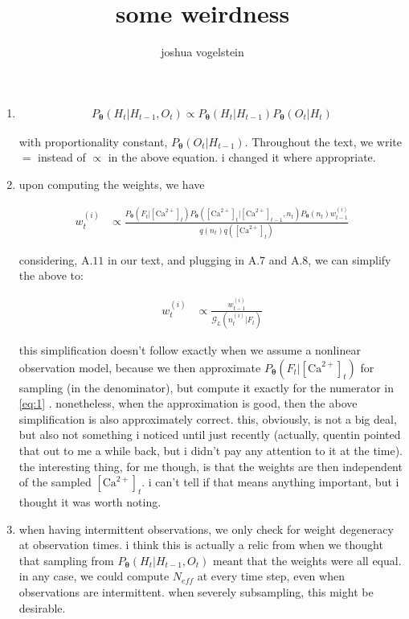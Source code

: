 \documentclass{article}
\title{some weirdness}
\author{joshua vogelstein}
\providecommand{\ve}[1]{\boldsymbol{#1}}
\providecommand{\ve}[1]{\boldsymbol{#1}}
\newcommand{\thetn}{\ve{\theta}}
\newcommand{\p}{P_{\thetn}}
\newcommand{\Ca}{[\text{Ca}^{2+}]}
\begin{document}
\begin{enumerate}
\item 
\begin{align}
\p(H_t | H_{t-1}, O_t) \propto \p(H_t | H_{t-1}) \p(O_t | H_t)
\end{align}

with proportionality constant, $\p(O_t | H_{t-1})$.  Throughout the text, we write $=$ instead of $\propto$ in the above equation. i changed it where appropriate.

\item upon computing the weights, we have

\begin{align}\label{eq:1}
w_t^{(i)} &\propto \frac{\p(F_t | \Ca_t) \p(\Ca_t | \Ca_{t-1}, n_t) \p(n_t) w_{t-1}^{(i)}}{q(n_t) q(\Ca_t)}
\end{align}

considering, A$.11$ in our text,  and plugging in A.7 and A.8, we can simplify the above to:

\begin{align}
w_t^{(i)} &\propto \frac{w_{t-1}^{(i)}}{\mathcal{G}_L(n_t^{(i)} | F_t)}
\end{align}

this simplification doesn't follow exactly when we assume a nonlinear observation model, because we then approximate $\p(F_t | \Ca_t)$ for sampling (in the denominator), but compute it exactly for the numerator in \eqref{eq:1} . nonetheless, when the approximation is good, then the above simplification is also approximately correct.  this, obviously, is not a big deal, but also not something i noticed until just recently (actually, quentin pointed that out to me a while back, but i didn't pay any attention to it at the time).  the interesting thing, for me though, is that the weights are then independent of the sampled $\Ca_t$.  i can't tell if that means anything important, but i thought it was worth noting.

\item when having intermittent observations, we only check for weight degeneracy at observation times. i think  this is actually a relic from when we thought that sampling from $\p(H_t | H_{t-1}, O_t)$ meant that the weights were all equal.  in any case, we could compute $N_{eff}$ at every time step, even when observations are intermittent.  when severely subsampling, this might be desirable.

\end{enumerate}
\end{document}
